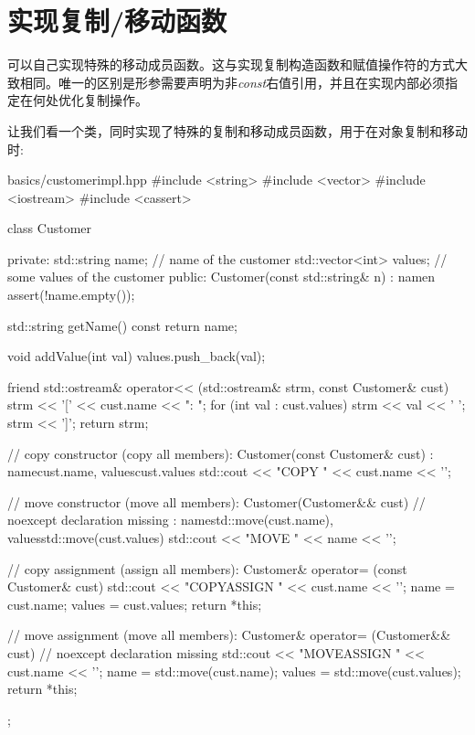 \section{实现复制/移动函数}

可以自己实现特殊的移动成员函数。这与实现复制构造函数和赋值操作符的方式大致相同。唯一的区别是形参需要声明为非\textit{const}右值引用，并且在实现内部必须指定在何处优化复制操作。\par

让我们看一个类，同时实现了特殊的复制和移动成员函数，用于在对象复制和移动时:\par

\begin{codeboxt}[cpp]{basics/customerimpl.hpp}
#include <string>
#include <vector>
#include <iostream>
#include <cassert>

class Customer {
  private:
  std::string name; // name of the customer
  std::vector<int> values; // some values of the customer
  public:
  Customer(const std::string& n)
  : name{n} {
    assert(!name.empty());
  }

  std::string getName() const {
    return name;
  }

  void addValue(int val) {
    values.push_back(val);
  }

  friend std::ostream& operator<< (std::ostream& strm, const Customer& cust) {
    strm << '[' << cust.name << ": ";
    for (int val : cust.values) {
      strm << val << ' ';
    }
    strm << ']';
    return strm;
  }

  // copy constructor (copy all members):
  Customer(const Customer& cust)
  : name{cust.name}, values{cust.values} {
    std::cout << "COPY " << cust.name << '\n';
  }

  // move constructor (move all members):
  Customer(Customer&& cust) // noexcept declaration missing
  : name{std::move(cust.name)}, values{std::move(cust.values)} {
    std::cout << "MOVE " << name << '\n';
  }

  // copy assignment (assign all members):
  Customer& operator= (const Customer& cust) {
    std::cout << "COPYASSIGN " << cust.name << '\n';
    name = cust.name;
    values = cust.values;
    return *this;
  }

  // move assignment (move all members):
  Customer& operator= (Customer&& cust) { // noexcept declaration missing
    std::cout << "MOVEASSIGN " << cust.name << '\n';
    name = std::move(cust.name);
    values = std::move(cust.values);
    return *this;
  }
};
\end{codeboxt}

